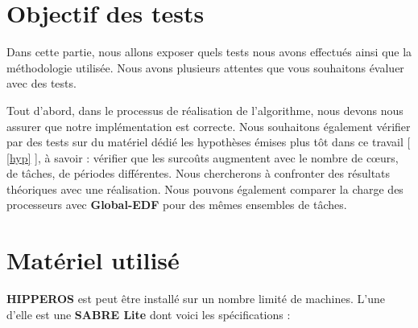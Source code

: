 \section{Objectif des tests}

	Dans cette partie, nous allons exposer quels tests nous avons effectués ainsi que 
	la méthodologie utilisée.
	Nous avons plusieurs attentes que vous souhaitons évaluer avec des tests. \newline
	 
	Tout d'abord, dans le processus de réalisation de l'algorithme, nous devons nous assurer 
	que notre implémentation est correcte. Nous souhaitons également vérifier par des tests 
	sur du matériel dédié les hypothèses émises plus tôt dans ce travail [ \hyperref[hyp]{\ref{hyp}} ], 
	à savoir : vérifier que les surcoûts augmentent avec le nombre de cœurs, de tâches, 
	de périodes différentes. 
	Nous chercherons à confronter des résultats théoriques avec une réalisation.
	Nous pouvons également comparer la charge des processeurs avec \textbf{Global-EDF} pour des mêmes ensembles de tâches.

	

\section{Matériel utilisé}
	\textbf{HIPPEROS} est peut être installé sur un nombre limité de machines. 
	L'une d'elle est une \textbf{SABRE Lite} dont voici les spécifications :
	
